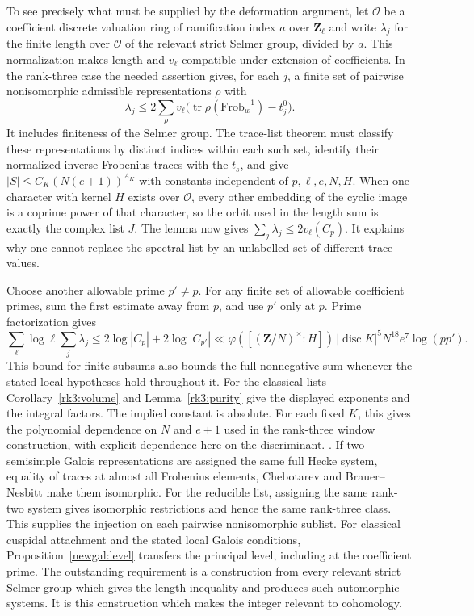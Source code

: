 To see precisely what must be supplied by the deformation argument, let
\(\mathcal O\) be a coefficient discrete valuation ring of ramification
index \(a\) over \(\mathbf Z_\ell\) and write \(\lambda_j\) for the
finite length over \(\mathcal O\) of the relevant strict Selmer group,
divided by \(a\). This normalization makes length and \(v_\ell\)
compatible under extension of coefficients. In the rank-three case the
needed assertion gives, for each \(j\), a finite set of pairwise
nonisomorphic admissible representations \(\rho\) with
\[
       \lambda_j\le
          2\sum_\rho v_\ell\bigl(\operatorname{tr}
                       \rho(\mathrm{Frob}_w^{-1})-t^0_j\bigr).
\]
It includes finiteness of the Selmer group. The trace-list theorem must
classify these representations by distinct indices within each such set,
identify their normalized inverse-Frobenius traces with the \(t_s\),
and give \(|S|\le C_K(N(e+1))^{A_K}\) with constants independent of
\(p,\ell,e,N,H\). When one character with kernel \(H\) exists over
\(\mathcal O\), every other embedding of the cyclic image is a coprime
power of that character, so the orbit used in the length sum is exactly
the complex list \(J\). The lemma now gives
\(\sum_j\lambda_j\le2v_\ell(C_p)\). It explains why one cannot replace
the spectral list by an unlabelled set of different trace values.

Choose another allowable prime \(p'\ne p\). For any finite set of
allowable coefficient primes, sum the first estimate away from \(p\),
and use \(p'\) only at \(p\). Prime factorization gives
\[
 \sum_{\ell}\log\ell\sum_j\lambda_j
       \le 2\log|C_p|+2\log|C_{p'}|
       \ll \varphi([(\mathbf Z/N)^\times:H])\,
          |\operatorname{disc}K|^5 N^{18}e^7\log(pp').
\]
This bound for finite subsums also bounds the full nonnegative sum
whenever the stated local hypotheses hold throughout it. For the
classical lists Corollary~\ref{rk3:volume} and Lemma~\ref{rk3:purity}
give the displayed exponents and the integral factors. The implied
constant is absolute. For each fixed \(K\), this gives the
polynomial dependence on \(N\) and \(e+1\) used in the rank-three
window construction, with explicit dependence here on the discriminant.
.
If two semisimple Galois representations are assigned the same full
Hecke system, equality of traces at almost all Frobenius elements,
Chebotarev and Brauer--Nesbitt make them isomorphic. For the reducible
list, assigning the same rank-two system gives isomorphic restrictions
and hence the same rank-three class. This supplies the injection on
each pairwise nonisomorphic sublist. For classical cuspidal attachment
and the stated local Galois conditions, Proposition~\ref{newgal:level}
transfers the principal level, including at the coefficient prime.
The outstanding requirement is a construction from every relevant strict
Selmer group which gives the length inequality and produces such
automorphic systems.
It is this construction which makes the integer relevant to cohomology.

